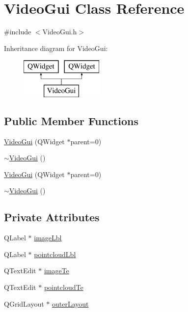 \hypertarget{class_video_gui}{\section{Video\-Gui Class Reference}
\label{class_video_gui}
}


{\ttfamily \#include $<$Video\-Gui.\-h$>$}

Inheritance diagram for Video\-Gui\-:\begin{figure}[H]
\begin{center}
\leavevmode
\includegraphics[height=2.000000cm]{class_video_gui}
\end{center}
\end{figure}
\subsection*{Public Member Functions}
\begin{DoxyCompactItemize}
\item 
\hyperlink{class_video_gui_a7b8a16a09e48a3f720cc1bd183fd8674}{Video\-Gui} (Q\-Widget $\ast$parent=0)
\item 
\hyperlink{class_video_gui_a6e534050dc3617ebaaa287f6bfde2cb2}{$\sim$\-Video\-Gui} ()
\item 
\hyperlink{class_video_gui_a7b8a16a09e48a3f720cc1bd183fd8674}{Video\-Gui} (Q\-Widget $\ast$parent=0)
\item 
\hyperlink{class_video_gui_a6e534050dc3617ebaaa287f6bfde2cb2}{$\sim$\-Video\-Gui} ()
\end{DoxyCompactItemize}
\subsection*{Private Attributes}
\begin{DoxyCompactItemize}
\item 
Q\-Label $\ast$ \hyperlink{class_video_gui_acabf5e05d19164c9ea78a3fc135063ca}{image\-Lbl}
\item 
Q\-Label $\ast$ \hyperlink{class_video_gui_a0fe846d1253b84ce60aedfa435bbfdfc}{pointcloud\-Lbl}
\item 
Q\-Text\-Edit $\ast$ \hyperlink{class_video_gui_a5e7d6fe6f8a140911e2f813296db579d}{image\-Te}
\item 
Q\-Text\-Edit $\ast$ \hyperlink{class_video_gui_a682f0bb767a19987413b987aaef49e88}{pointcloud\-Te}
\item 
Q\-Grid\-Layout $\ast$ \hyperlink{class_video_gui_a45d651b172a5cc6bde6e9bb0daa0dc2b}{outer\-Layout}
\end{DoxyCompactItemize}


